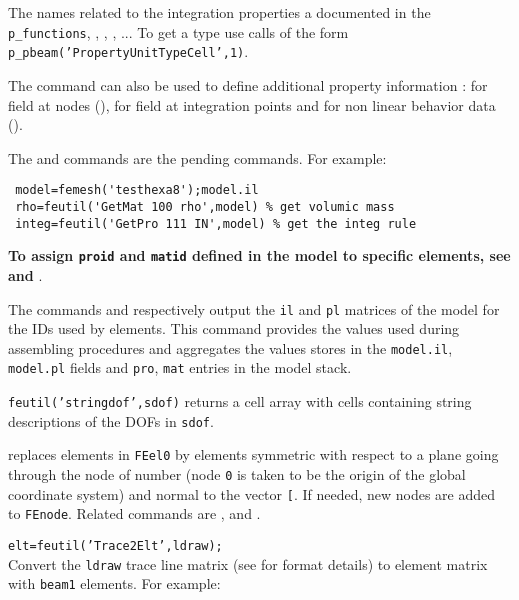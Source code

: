 The names related to the integration properties a documented in the {\tt p\_functions}, \psolid, \pshell, \pbeam, ... To get a type use calls of the form {\tt p\_pbeam('PropertyUnitTypeCell',1)}. 

The command can also be used to define additional property information :  for field at nodes (),  for field at integration points and  for non linear behavior data (\nlspring). 

The  and  commands are the pending commands. For example:
\begin{verbatim}
 model=femesh('testhexa8');model.il
 rho=feutil('GetMat 100 rho',model) % get volumic mass
 integ=feutil('GetPro 111 IN',model) % get the integ rule
\end{verbatim}%
  
{\bf To assign {\tt proid} and {\tt matid} defined in the model to specific elements, see  and }.
  
The commands  and  respectively output the {\tt il} and {\tt pl} matrices of the model for the IDs used by elements. This command provides the values used during assembling procedures and aggregates the values stores in the {\tt model.il}, {\tt model.pl} fields and {\tt pro}, {\tt mat} entries in the model stack.



{\tt feutil('stringdof',sdof)} returns a cell array with cells containing string descriptions of the DOFs in {\tt sdof}.


 replaces elements in {\tt FEel0} by elements symmetric with respect to a plane going through the node of number  (node {\tt 0} is taken to be the origin of the global coordinate system) and normal to the vector {\tt [}\tsi{nx ny nz}{\tt ]}. If needed, new nodes are added to {\tt FEnode}.  
Related commands are ,  and .

{\tt elt=feutil('Trace2Elt',ldraw);}\\
Convert the {\tt ldraw} trace line matrix (see  for format details) to element matrix with {\tt beam1} elements. For example:

